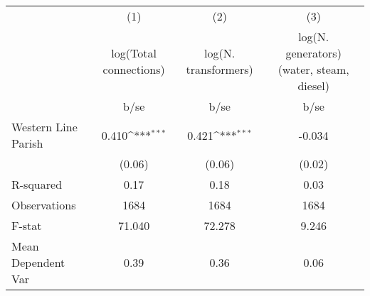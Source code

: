 {
\def\sym#1{\ifmmode^{#1}\else\(^{#1}\)\fi}
\begin{tabular}{l*{3}{c}}
\hline\hline
                    &\multicolumn{1}{c}{(1)}         &\multicolumn{1}{c}{(2)}         &\multicolumn{1}{c}{(3)}         \\
                    &log(Total connections)         &log(N. transformers)         &log(N. generators) (water, steam, diesel)         \\
                    &        b/se         &        b/se         &        b/se         \\
\hline
Western Line Parish &       0.410\sym{***}&       0.421\sym{***}&      -0.034         \\
                    &      (0.06)         &      (0.06)         &      (0.02)         \\
\hline
R-squared           &        0.17         &        0.18         &        0.03         \\
Observations        &        1684         &        1684         &        1684         \\
F-stat              &      71.040         &      72.278         &       9.246         \\
Mean Dependent Var  &        0.39         &        0.36         &        0.06         \\
\hline\hline
\end{tabular}
}
